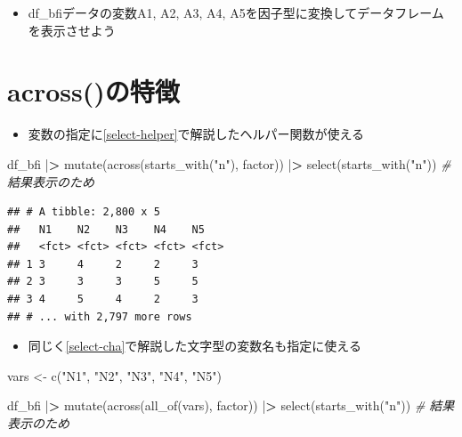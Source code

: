 \documentclass[
  xelatex,ja=standard, b5paper]{bxjsbook}
\newenvironment{Shaded}{\begin{snugshade}}{\end{snugshade}}
\newcommand{\CommentTok}[1]{\textcolor[rgb]{0.56,0.35,0.01}{\textit{#1}}}
\newcommand{\ErrorTok}[1]{\textcolor[rgb]{0.64,0.00,0.00}{\textbf{#1}}}
\newcommand{\FunctionTok}[1]{\textcolor[rgb]{0.00,0.00,0.00}{#1}}
\newcommand{\NormalTok}[1]{#1}
\newcommand{\OtherTok}[1]{\textcolor[rgb]{0.56,0.35,0.01}{#1}}
\newcommand{\SpecialCharTok}[1]{\textcolor[rgb]{0.00,0.00,0.00}{#1}}
\newcommand{\StringTok}[1]{\textcolor[rgb]{0.31,0.60,0.02}{#1}}
\providecommand{\tightlist}{%
  \setlength{\itemsep}{0pt}\setlength{\parskip}{0pt}}
\begin{document}
\begin{itemize}
\tightlist
\item
  df\_bfiデータの変数A1, A2, A3, A4, A5を因子型に変換してデータフレームを表示させよう
\end{itemize}

\hypertarget{mu-across}{%
\section{across()の特徴}\label{mu-across}}

\begin{itemize}
\tightlist
\item
  変数の指定に\ref{select-helper}で解説したヘルパー関数が使える
\end{itemize}

\begin{Shaded}
\begin{Highlighting}[]
\NormalTok{df\_bfi }\SpecialCharTok{|}\ErrorTok{\textgreater{}}
  \FunctionTok{mutate}\NormalTok{(}\FunctionTok{across}\NormalTok{(}\FunctionTok{starts\_with}\NormalTok{(}\StringTok{"n"}\NormalTok{),}
\NormalTok{                factor)) }\SpecialCharTok{|}\ErrorTok{\textgreater{}} 
  \FunctionTok{select}\NormalTok{(}\FunctionTok{starts\_with}\NormalTok{(}\StringTok{"n"}\NormalTok{))   }\CommentTok{\# 結果表示のため}
\end{Highlighting}
\end{Shaded}

\begin{verbatim}
## # A tibble: 2,800 x 5
##   N1    N2    N3    N4    N5   
##   <fct> <fct> <fct> <fct> <fct>
## 1 3     4     2     2     3    
## 2 3     3     3     5     5    
## 3 4     5     4     2     3    
## # ... with 2,797 more rows
\end{verbatim}

\begin{itemize}
\tightlist
\item
  同じく\ref{select-cha}で解説した文字型の変数名も指定に使える
\end{itemize}

\begin{Shaded}
\begin{Highlighting}[]
\NormalTok{vars }\OtherTok{\textless{}{-}} \FunctionTok{c}\NormalTok{(}\StringTok{"N1"}\NormalTok{, }\StringTok{"N2"}\NormalTok{, }\StringTok{"N3"}\NormalTok{, }\StringTok{"N4"}\NormalTok{, }\StringTok{"N5"}\NormalTok{)}

\NormalTok{df\_bfi }\SpecialCharTok{|}\ErrorTok{\textgreater{}}
  \FunctionTok{mutate}\NormalTok{(}\FunctionTok{across}\NormalTok{(}\FunctionTok{all\_of}\NormalTok{(vars),}
\NormalTok{                factor)) }\SpecialCharTok{|}\ErrorTok{\textgreater{}} 
  \FunctionTok{select}\NormalTok{(}\FunctionTok{starts\_with}\NormalTok{(}\StringTok{"n"}\NormalTok{))   }\CommentTok{\# 結果表示のため}
\end{Highlighting}
\end{Shaded}
\end{document}
